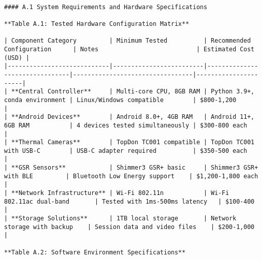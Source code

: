 \documentclass[11pt,a4paper]{report}
\begin{document}
\begin{verbatim}

#### A.1 System Requirements and Hardware Specifications

**Table A.1: Tested Hardware Configuration Matrix**

| Component Category         | Minimum Tested          | Recommended Configuration      | Notes                           | Estimated Cost (USD) |
|----------------------------|-------------------------|--------------------------------|---------------------------------|----------------------|
| **Central Controller**     | Multi-core CPU, 8GB RAM | Python 3.9+, conda environment | Linux/Windows compatible        | $800-1,200           |
| **Android Devices**        | Android 8.0+, 4GB RAM   | Android 11+, 6GB RAM           | 4 devices tested simultaneously | $300-800 each        |
| **Thermal Cameras**        | TopDon TC001 compatible | TopDon TC001 with USB-C        | USB-C adapter required          | $350-500 each        |
| **GSR Sensors**            | Shimmer3 GSR+ basic     | Shimmer3 GSR+ with BLE         | Bluetooth Low Energy support    | $1,200-1,800 each    |
| **Network Infrastructure** | Wi-Fi 802.11n           | Wi-Fi 802.11ac dual-band       | Tested with 1ms-500ms latency   | $100-400             |
| **Storage Solutions**      | 1TB local storage       | Network storage with backup    | Session data and video files    | $200-1,000           |

**Table A.2: Software Environment Specifications**


\end{verbatim}
\end{document}
